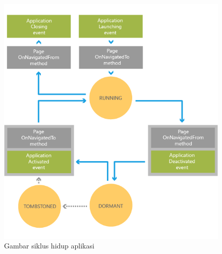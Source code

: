\begin{figure}[h]
	\centering
		\includegraphics[scale=0.4]{Gambar/lifecycle_wp8}
	\caption{Gambar siklus hidup aplikasi\cite{MSDN}}
	\label{fig:Siklus Hidup Aplikasi}
\end{figure}

